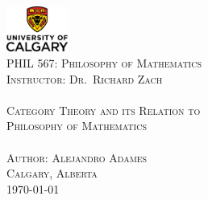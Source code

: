\begin{titlepage}
\begin{center}
    
    \includegraphics[width=0.15\textwidth]{images/uc-vert-rgb.png}~\\[2.5cm]
    
    \textsc{\Large PHIL 567: Philosophy of Mathematics}\\[2.5cm]
    
    \textsc{\Large Instructor: Dr.~Richard Zach}\\[2.75cm]
    
    \HRule \\[0.4cm]
    \textsc{\LARGE Category Theory and its Relation to \\\vspace{0.5ex}
    Philosophy of Mathematics}\\[0.4cm]
    \HRule \\ [3.0cm]


    \textsc{\Large Author: Alejandro Adames}\\[3.0cm]

    \textsc{Calgary, Alberta}\\ [0.5cm]

    {\large \today}
\end{center}
\end{titlepage}